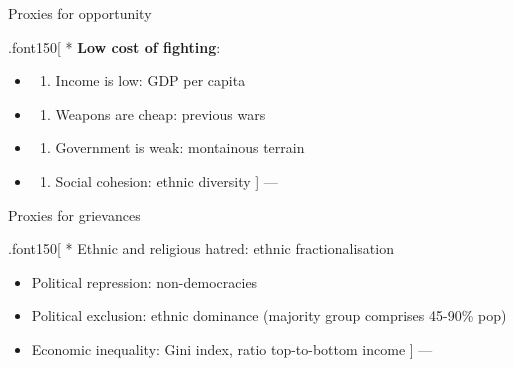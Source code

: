 \documentclass[ignorenonframetext,]{beamer}
\providecommand{\tightlist}{%
  \setlength{\itemsep}{0pt}\setlength{\parskip}{0pt}}
\begin{document}
\begin{frame}{Proxies for opportunity}

.font150{[} * \textbf{Low cost of fighting}:

\begin{itemize}
\item
  \begin{enumerate}
  \def\labelenumi{\arabic{enumi})}
  \tightlist
  \item
    Income is low: GDP per capita
  \end{enumerate}
\item
  \begin{enumerate}
  \def\labelenumi{\arabic{enumi})}
  \setcounter{enumi}{1}
  \tightlist
  \item
    Weapons are cheap: previous wars
  \end{enumerate}
\item
  \begin{enumerate}
  \def\labelenumi{\arabic{enumi})}
  \setcounter{enumi}{2}
  \tightlist
  \item
    Government is weak: montainous terrain
  \end{enumerate}
\item
  \begin{enumerate}
  \def\labelenumi{\arabic{enumi})}
  \setcounter{enumi}{3}
  \tightlist
  \item
    Social cohesion: ethnic diversity {]} ---
  \end{enumerate}
\end{itemize}

\end{frame}

\begin{frame}{Proxies for grievances}

.font150{[} * Ethnic and religious hatred: ethnic fractionalisation

\begin{itemize}
\item
  Political repression: non-democracies
\item
  Political exclusion: ethnic dominance (majority group comprises
  45-90\% pop)
\item
  Economic inequality: Gini index, ratio top-to-bottom income {]} ---
\end{itemize}

\end{frame}
\end{document}
